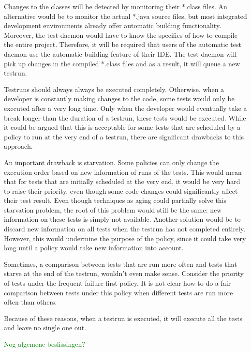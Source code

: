 \documentclass[i2]{oss}
\newcommand{\comment}[1]{{\huge \textcolor{green}{#1}}\\}
\begin{document}
Changes to the classes will be detected by monitoring their *.class files.
An alternative would be to monitor the actual *.java source files, but most integrated development environments already offer automatic building functionality.
Moreover, the test daemon would have to know the specifics of how to compile the entire project. 
Therefore, it will be required that users of the automatic test daemon use the automatic building feature of their IDE.
The test daemon will pick up changes in the compiled *.class files and as a result, it will queue a new testrun.

Testruns should always always be executed completely.
Otherwise, when a developer is constantly making changes to the code, some tests would only be executed after a very long time.
Only when the developer would eventually take a break longer than the duration of a testrun, these tests would be executed.
While it could be argued that this is acceptable for some tests that are scheduled by a policy to run at the very end of a testrun, there are significant drawbacks to this approach.

An important drawback is starvation. Some policies can only change the execution order based on new information of runs of the tests.
This would mean that for tests that are initially scheduled at the very end, it would be very hard to raise their priority, even though some code changes could significantly affect their test result.
Even though techniques as aging could partially solve this starvation problem, the root of this problem would still be the same: new information on these tests is simply not available. Another solution would be to discard new information on all tests when the testrun has not completed entirely. However, this would undermine the purpose of the policy, since it could take very long until a policy would take new information into account.

Sometimes, a comparison between tests that are run more often and tests that starve at the end of the testrun, wouldn't even make sense.
Consider the priority of tests under the frequent failure first policy.
It is not clear how to do a fair comparison between tests under this policy when different tests are run more often than others.

Because of these reasons, when a testrun is executed, it will execute all the tests and leave no single one out.

\comment{Nog algemene beslissingen?}

\end{document}
